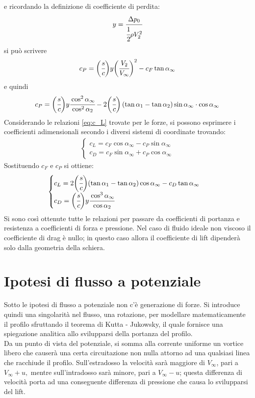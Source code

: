 e ricordando la definizione di coefficiente di perdita:
\begin{align*}
y = \cfrac{\Delta p_0}{\cfrac{1}{2} \rho V_2^2}
\end{align*}
si può scrivere
\begin{align*}
c_P = \bigg(\cfrac{s}{c}\bigg)y \bigg(\cfrac{V_2}{V_{\infty}}\bigg)^2 - c_F \tan \alpha_{\infty}
\end{align*}
e quindi
\begin{equation}
c_P = \bigg(\cfrac{s}{c}\bigg)y \cfrac{\cos^2 \alpha_{\infty}}{\cos^2 \alpha_2} -2\bigg(\cfrac{s}{c}\bigg) \left(\tan \alpha_1 - \tan \alpha_2 \right) \sin \alpha_{\infty} \cdot \cos \alpha_{\infty}
\end{equation} 
Considerando le relazioni \ref{eq:c_L} trovate per le forze, si possono esprimere i coefficienti adimensionali secondo i diversi sistemi di coordinate trovando:
\begin{align*}
\begin{cases}
c_L = c_F \cos \alpha_{\infty} - c_P \sin \alpha_{\infty} \\
c_D = c_F \sin \alpha_{\infty} + c_P \cos \alpha_{\infty}
\end{cases}
\end{align*}
Sostituendo $c_F$ e $c_P$ si ottiene:
\begin{equation}
\begin{cases}
c_L = 2 \bigg(\cfrac{s}{c}\bigg) (\tan \alpha_1 - \tan \alpha_2) \cos \alpha_{\infty} - c_D \tan \alpha_{\infty} \\
c_D = \bigg(\cfrac{s}{c}\bigg) y \cfrac{\cos^3 \alpha_{\infty}}{\cos \alpha_2}
\end{cases}
\end{equation}
Si sono così ottenute tutte le relazioni per passare da coefficienti di portanza e resistenza a coefficienti di forza e pressione. Nel caso di fluido ideale non viscoso il coefficiente di drag è nullo; in questo caso allora il coefficiente di lift dipenderà solo dalla geometria della schiera.
\section{Ipotesi di flusso a potenziale}
Sotto le ipotesi di flusso a potenziale non c'è generazione di forze. Si introduce quindi una singolarità nel flusso, una rotazione, per modellare matematicamente il profilo sfruttando il teorema di Kutta - Jukowsky, il quale fornisce una spiegazione analitica allo svilupparsi della portanza del profilo.\\
Da un punto di vista del potenziale, si somma alla corrente uniforme un vortice libero che causerà una certa circuitazione non nulla attorno ad una qualsiasi linea che racchiude il profilo. Sull'estradosso la velocità sarà maggiore di $V_{\infty}$, pari a $V_{\infty}+u,$ mentre sull'intradosso sarà minore, pari a $V_{\infty}-u$; questa differenza di velocità porta ad una conseguente differenza di pressione che causa lo svilupparsi del lift.

